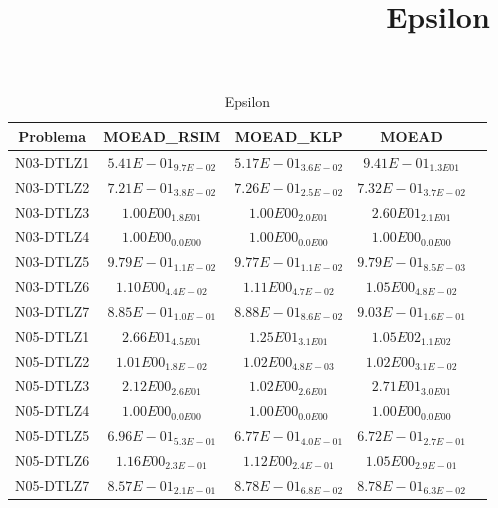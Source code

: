 \documentclass{article}
\title{Epsilon}
\author{}
\begin{document}
\maketitle
\begin{table*}[ht!]
\scriptsize
\caption{Epsilon}
\centering\begin{tabular}{|c||c||c||c||c|} \hline
Problema &MOEAD_RSIM &MOEAD_KLP &MOEAD\\\hline
N03-DTLZ1 &\cellcolor{gray25}$5.41E-01_{9.7E-02}$ &\cellcolor{gray95}$5.17E-01_{3.6E-02}$ &$9.41E-01_{1.3E01}$\\ 
\hline
N03-DTLZ2 &\cellcolor{gray95}$7.21E-01_{3.8E-02}$ &\cellcolor{gray25}$7.26E-01_{2.5E-02}$ &$7.32E-01_{3.7E-02}$\\ 
\hline
N03-DTLZ3 &\cellcolor{gray95}$1.00E00_{1.8E01}$ &\cellcolor{gray25}$1.00E00_{2.0E01}$ &$2.60E01_{2.1E01}$\\ 
\hline
N03-DTLZ4 &\cellcolor{gray95}$1.00E00_{0.0E00}$ &\cellcolor{gray25}$1.00E00_{0.0E00}$ &$1.00E00_{0.0E00}$\\ 
\hline
N03-DTLZ5 &$9.79E-01_{1.1E-02}$ &\cellcolor{gray95}$9.77E-01_{1.1E-02}$ &\cellcolor{gray25}$9.79E-01_{8.5E-03}$\\ 
\hline
N03-DTLZ6 &\cellcolor{gray25}$1.10E00_{4.4E-02}$ &$1.11E00_{4.7E-02}$ &\cellcolor{gray95}$1.05E00_{4.8E-02}$\\ 
\hline
N03-DTLZ7 &\cellcolor{gray95}$8.85E-01_{1.0E-01}$ &\cellcolor{gray25}$8.88E-01_{8.6E-02}$ &$9.03E-01_{1.6E-01}$\\ 
\hline
N05-DTLZ1 &\cellcolor{gray25}$2.66E01_{4.5E01}$ &\cellcolor{gray95}$1.25E01_{3.1E01}$ &$1.05E02_{1.1E02}$\\ 
\hline
N05-DTLZ2 &\cellcolor{gray95}$1.01E00_{1.8E-02}$ &\cellcolor{gray25}$1.02E00_{4.8E-03}$ &$1.02E00_{3.1E-02}$\\ 
\hline
N05-DTLZ3 &\cellcolor{gray25}$2.12E00_{2.6E01}$ &\cellcolor{gray95}$1.02E00_{2.6E01}$ &$2.71E01_{3.0E01}$\\ 
\hline
N05-DTLZ4 &\cellcolor{gray95}$1.00E00_{0.0E00}$ &\cellcolor{gray25}$1.00E00_{0.0E00}$ &$1.00E00_{0.0E00}$\\ 
\hline
N05-DTLZ5 &$6.96E-01_{5.3E-01}$ &\cellcolor{gray25}$6.77E-01_{4.0E-01}$ &\cellcolor{gray95}$6.72E-01_{2.7E-01}$\\ 
\hline
N05-DTLZ6 &$1.16E00_{2.3E-01}$ &\cellcolor{gray25}$1.12E00_{2.4E-01}$ &\cellcolor{gray95}$1.05E00_{2.9E-01}$\\ 
\hline
N05-DTLZ7 &\cellcolor{gray95}$8.57E-01_{2.1E-01}$ &$8.78E-01_{6.8E-02}$ &\cellcolor{gray25}$8.78E-01_{6.3E-02}$\\ 

\end{tabular}
\end{table*}
\end{document}
